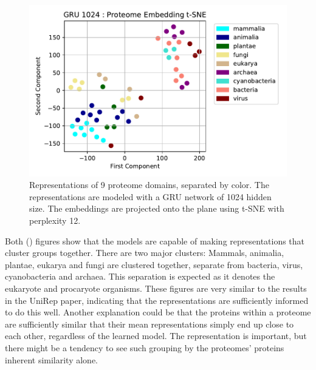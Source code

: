 \documentclass[a4paper,12pt]{article}
\begin{document}
\begin{figure}[H]
    \centering
    \includegraphics[width=0.95\linewidth]{figures/fig2b_GRU_1024_no_trunc.pdf}
    \caption{Representations of 9 proteome domains, separated by color. The representations are modeled with a GRU network of 1024 hidden size. The embeddings are projected onto the plane using t-SNE with perplexity 12.}
    \label{fig:fig2b_GRU}
\end{figure}

Both () figures show that the models are capable of making representations that cluster groups together. There are two major clusters: Mammals, animalia, plantae, eukarya and fungi are clustered together, separate from bacteria, virus, cyanobacteria and archaea. This separation is expected as it denotes the eukaryote and procaryote organisms. These figures are very similar to the results in the UniRep paper, indicating that the representations are sufficiently informed to do this well. Another explanation could be that the proteins within a proteome are sufficiently similar that their mean representations simply end up close to each other, regardless of the learned model. The representation is important, but there might be a tendency to see such grouping by the proteomes' proteins inherent similarity alone.
\end{document}
